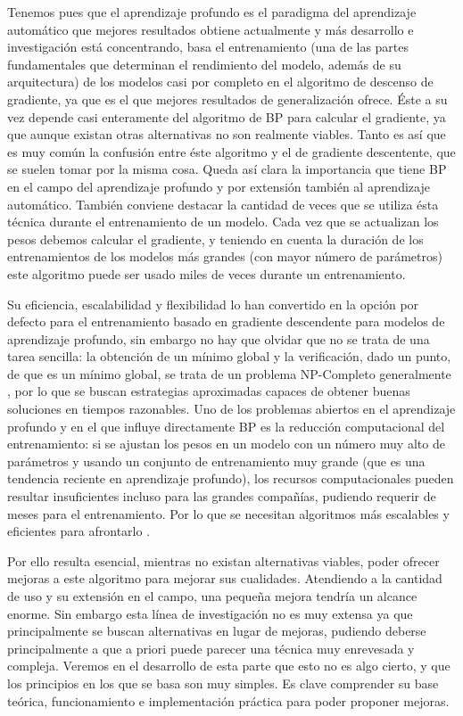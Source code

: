 Tenemos pues que el aprendizaje profundo es el paradigma del aprendizaje automático que mejores resultados obtiene actualmente y más desarrollo e investigación está concentrando, basa el entrenamiento (una de las partes fundamentales que determinan el rendimiento del modelo, además de su arquitectura) de los modelos casi por completo en el algoritmo de descenso de gradiente, ya que es el que mejores resultados de generalización ofrece. Éste a su vez depende casi enteramente del algoritmo de BP para calcular el gradiente, ya que aunque existan otras alternativas no son realmente viables. Tanto es así que es muy común la confusión entre éste algoritmo y el de gradiente descentente, que se suelen tomar por la misma cosa. Queda así clara la importancia que tiene BP en el campo del aprendizaje profundo y por extensión también al aprendizaje automático. También conviene destacar la cantidad de veces que se utiliza ésta técnica durante el entrenamiento de un modelo. Cada vez que se actualizan los pesos debemos calcular el gradiente, y teniendo en cuenta la duración de los entrenamientos de los modelos más grandes (con mayor número de parámetros) este algoritmo puede ser usado miles de veces durante un entrenamiento.

Su eficiencia, escalabilidad y flexibilidad lo han convertido en la opción por defecto para el entrenamiento basado en gradiente descendente para modelos de aprendizaje profundo, sin embargo no hay que olvidar que no se trata de una tarea sencilla: la obtención de un mínimo global y la verificación, dado un punto, de que es un mínimo global, se trata de un problema NP-Completo generalmente \cite{NPHardProblem}, por lo que se buscan estrategias aproximadas capaces de obtener buenas soluciones en tiempos razonables. Uno de los problemas abiertos en el aprendizaje profundo y en el que influye directamente BP es la reducción computacional del entrenamiento: si se ajustan los pesos en un modelo con un número muy alto de parámetros y usando un conjunto de entrenamiento muy grande (que es una tendencia reciente en aprendizaje profundo), los recursos computacionales pueden resultar insuficientes incluso para las grandes compañías, pudiendo requerir de meses para el  entrenamiento. Por lo que se necesitan algoritmos más escalables y eficientes para afrontarlo \cite{Problem3_accel}.

Por ello resulta esencial, mientras no existan alternativas viables, poder ofrecer mejoras a este algoritmo para mejorar sus cualidades. Atendiendo a la cantidad de uso y su extensión en el campo, una pequeña mejora tendría un alcance enorme. Sin embargo esta línea de investigación no es muy extensa ya que principalmente se buscan alternativas en lugar de mejoras, pudiendo deberse principalmente a que a priori puede parecer una técnica muy enrevesada y compleja. Veremos en el desarrollo de esta parte que esto no es algo cierto, y que los principios en los que se basa son muy simples. Es clave comprender su base teórica, funcionamiento e implementación práctica para poder proponer mejoras. 


